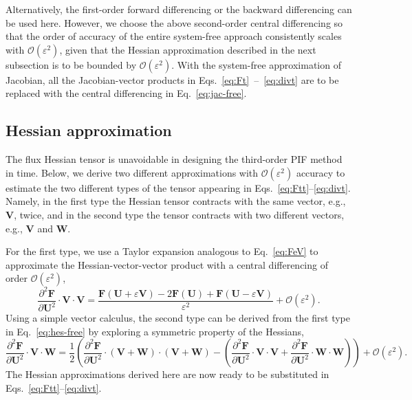 \documentclass[times,preprint,3p]{elsarticle}
\newcommand{\pdd}[2]{\frac{\partial^{2} #1}{\partial #2^{2}}}
\newcommand{\bF}{\mathbf{F}}
\newcommand{\bU}{\mathbf{U}}
\newcommand{\bV}{\mathbf{V}}
\newcommand{\bW}{\mathbf{W}}
\begin{document}
Alternatively, the first-order forward differencing or the backward differencing can be used here.
However, we choose the above second-order central differencing
so that the order of accuracy of the entire system-free approach consistently
scales with \( \mathcal{O}(\varepsilon^{2}) \),
given that
the Hessian approximation described in the next subsection
is to be bounded by \( \mathcal{O}(\varepsilon^{2}) \).
%
With the system-free approximation of Jacobian, %
all the Jacobian-vector products %
in
Eqs.~\eqref{eq:Ft}~--~\eqref{eq:divt} are to be replaced
with the central differencing in Eq.~\eqref{eq:jac-free}.



\subsection{Hessian approximation}\label{subsec:hes-approx}
%
The flux Hessian tensor is unavoidable in designing the third-order PIF method in time.
Below, we derive two different approximations with
$\mathcal{O}(\varepsilon^{2})$ accuracy
to estimate the two different types of the tensor appearing in
Eqs.~\eqref{eq:Ftt}--\eqref{eq:divt}.
Namely, in the first type the Hessian tensor contracts with the same vector, e.g., $\bV$, twice,
and in the second type the tensor contracts with two different vectors, e.g., $\bV$ and $\bW$.

For the first type, we use a Taylor expansion analogous to
Eq.~\eqref{eq:FeV} to approximate the
Hessian-vector-vector product with a central differencing of order $\mathcal{O}(\varepsilon^{2})$,
\begin{equation}\label{eq:hes-free}
    \pdd{\bF}{\bU} \cdot \bV \cdot \bV =
    \frac{\bF(\bU + \varepsilon \bV) - 2 \bF(\bU) + \bF(\bU - \varepsilon \bV)}{\varepsilon^{2}}
    + \mathcal{O}(\varepsilon^{2}).
\end{equation}
%
%
Using a simple vector calculus,
the second type can be derived from the first type in Eq.~\eqref{eq:hes-free}
by exploring a symmetric property of the Hessians,
\begin{equation}\label{eq:hes-v-w}
    \pdd{\bF}{\bU} \cdot \bV \cdot \bW =
    \frac{1}{2} \left( \pdd{\bF}{\bU} \cdot \left( \bV + \bW \right) \cdot \left( \bV + \bW \right) -
    \left( \pdd{\bF}{\bU} \cdot \bV \cdot \bV + \pdd{\bF}{\bU} \cdot \bW \cdot \bW \right) \right)
    + \mathcal{O}(\varepsilon^{2}).
\end{equation}
The Hessian approximations derived here are now ready to be substituted
in Eqs.~\eqref{eq:Ftt}--\eqref{eq:divt}.
\end{document}
